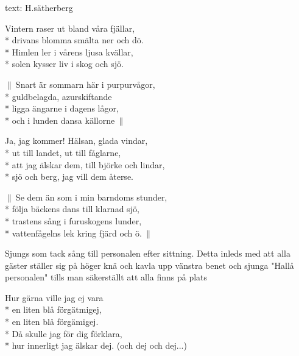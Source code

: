 \begin{SongText}
    \begin{SongInfo}
        text: H.sätherberg
    \end{SongInfo}
    \begin{Verse}
        Vintern raser ut bland våra fjällar,\\*%
        drivans blomma smälta ner och dö.\\*%
        Himlen ler i vårens ljusa kvällar,\\*%
        solen kysser liv i skog och sjö.
    \end{Verse}
    \begin{Verse}
        $\|\:$Snart är sommarn här i purpurvågor,\\*%
        guldbelagda, azurskiftande\\*%
        ligga ängarne i dagens lågor,\\*%
        och i lunden dansa källorne$\:\|$
    \end{Verse}
    \begin{Verse}
        Ja, jag kommer! Hälsan, glada vindar,\\*%
        ut till landet, ut till fåglarne,\\*%
        att jag älskar dem, till björke och lindar,\\*%
        sjö och berg, jag vill dem återse.
    \end{Verse}
    \begin{Verse}
        $\|\:$Se dem än som i min barndoms stunder,\\*%
        följa bäckens dans till klarnad sjö,\\*%
        trastens sång i furuskogens lunder,\\*%
        vattenfågelns lek kring fjärd och ö.$\:\|$
    \end{Verse}
\end{SongText}

\begin{SongText}
    \begin{SongInfo}
        Sjungs som tack sång till personalen efter sittning.
        Detta inleds med att alla gäster ställer sig på höger knä och kavla upp vänstra benet och sjunga "Hallå personalen" tills man säkerställt att alla finns på plats
    \end{SongInfo}
    \begin{Verse}
        Hur gärna ville jag ej vara\\*%
        en liten blå förgätmigej,\\*%
        en liten blå förgämigej.\\*%
        Då skulle jag för dig förklara,\\*%
        hur innerligt jag älskar dej. (och dej och dej...)
    \end{Verse}
\end{SongText}

